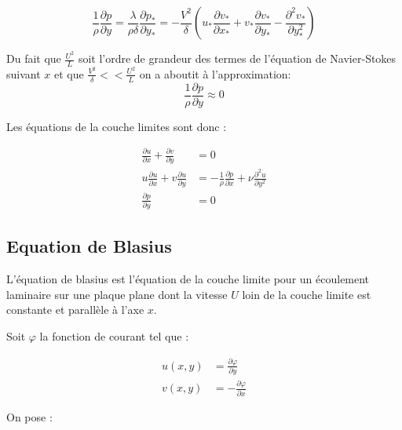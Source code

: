 \documentclass[french]{article}
\begin{document}
\begin{equation*}
	\frac{1}{\rho}
	\frac{\partial p}{\partial y} 
	= \frac{\lambda}{\rho\delta}
	\frac{\partial p_{*}}{\partial  y_{*}}
	= - \frac{V^{2}}{\delta}
	\left(
	u_{*}\frac{\partial v_{*}}{\partial x_{*}} + 
	v_{*}\frac{\partial v_{*}}{\partial y_{*}} 
	-\frac{\partial^{2} v_{*}}{\partial  y_{*}^{2}} 
	\right)
\end{equation*}

Du fait que $\frac{U^{2}}{L}$ soit l'ordre de grandeur des termes de l'équation de Navier-Stokes suivant $x$ et que $\frac{V^{2}}{\delta} << \frac{U^2}{L}$ on a aboutit à l'approximation:
\begin{equation*}
	\frac{1}{\rho}\frac{\partial p}{\partial y} \approx 0
\end{equation*}

Les équations de la couche limites sont donc :

\begin{align}	
	\frac{\partial u}{\partial x} 
	+
	\frac{\partial v}{\partial y} 
	&= 0 \\
	u\frac{\partial u}{\partial x} + 
	v\frac{\partial u}{\partial y} 
	&= - \frac{1}{\rho}
	\frac{\partial p}{\partial  x} +
	\nu
	\frac{\partial^{2} u}{\partial  y^{2}} \\
	\frac{\partial p}{\partial y} 
	&= 0
\end{align}
\subsection{Equation de Blasius}
L'équation de blasius est l'équation de la couche limite pour un écoulement laminaire sur une plaque plane dont la vitesse $U$ loin de la couche limite est constante et parallèle à l'axe $x$.

Soit $\varphi$ la fonction de courant tel que :

\begin{align*}
	u(x,y) &= 
	\frac{\partial \varphi}{\partial y} \\
	v(x,y) &= - 
	\frac{\partial \varphi}{\partial x}
\end{align*}

On pose :
\end{document}
